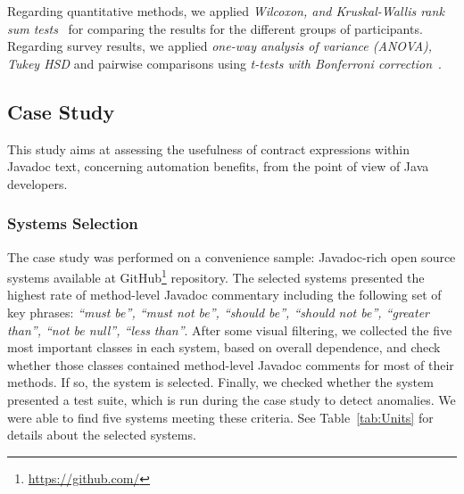 Regarding quantitative methods, we applied \emph{Wilcoxon, and Kruskal-Wallis rank sum tests}~\cite{statistical} for comparing the results for the different groups of participants. Regarding survey results, we applied \emph{one-way analysis of variance (ANOVA), Tukey HSD} and pairwise comparisons using \emph{t-tests with Bonferroni correction}~\cite{statistical}.%

\subsection{Case Study}
\label{sec:caseStudy}
This study aims at assessing the usefulness of contract expressions within Javadoc text, concerning automation benefits, from the point of view of Java developers. 

\subsubsection{Systems Selection} 
\label{sec:systems}

The case study was performed on a convenience sample: \totalSystems{} Javadoc-rich open source systems available at GitHub\footnote{\url{https://github.com/}} repository.
The selected systems presented the highest rate of method-level Javadoc commentary including the following set of key phrases: \emph{``must be'', ``must not be'', ``should
be'', ``should not be'', ``greater than'', ``not be null'', ``less than''}.
After some visual filtering, we collected the five most important classes in
each system, based on overall dependence, and check whether those classes
contained method-level Javadoc comments for most of their methods. If so, the
system is selected. Finally, we checked whether the system presented a test suite, which is run during the case study to detect anomalies. We
were able to find five systems meeting these criteria.
See Table~\ref{tab:Units} for details about the selected systems. 

